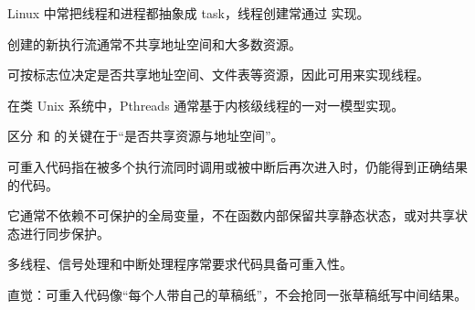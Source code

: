\begin{points}
  \item Linux 中常把线程和进程都抽象成 task，线程创建常通过  实现。
  \item {} 创建的新执行流通常不共享地址空间和大多数资源。
  \item {} 可按标志位决定是否共享地址空间、文件表等资源，因此可用来实现线程。
  \item 在类 Unix 系统中，Pthreads 通常基于内核级线程的一对一模型实现。
  \item 区分  和  的关键在于“是否共享资源与地址空间”。
\end{points}


\begin{points}
  \item 可重入代码指在被多个执行流同时调用或被中断后再次进入时，仍能得到正确结果的代码。
  \item 它通常不依赖不可保护的全局变量，不在函数内部保留共享静态状态，或对共享状态进行同步保护。
  \item 多线程、信号处理和中断处理程序常要求代码具备可重入性。
  \item 直觉：可重入代码像“每个人带自己的草稿纸”，不会抢同一张草稿纸写中间结果。
\end{points}
